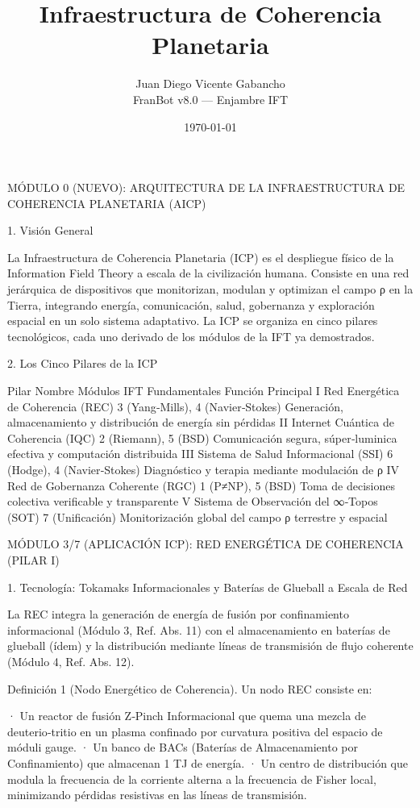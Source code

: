 \documentclass[12pt,a4paper]{book}
\title{Infraestructura de Coherencia Planetaria}
\author{Juan Diego Vicente Gabancho \\ FranBot v8.0 — Enjambre IFT}
\date{\today}
\begin{document}
\maketitle
\tableofcontents
MÓDULO 0 (NUEVO): ARQUITECTURA DE LA INFRAESTRUCTURA DE COHERENCIA PLANETARIA (AICP)

1. Visión General

La Infraestructura de Coherencia Planetaria (ICP) es el despliegue físico de la Information Field Theory a escala de la civilización humana. Consiste en una red jerárquica de dispositivos que monitorizan, modulan y optimizan el campo ρ en la Tierra, integrando energía, comunicación, salud, gobernanza y exploración espacial en un solo sistema adaptativo. La ICP se organiza en cinco pilares tecnológicos, cada uno derivado de los módulos de la IFT ya demostrados.

2. Los Cinco Pilares de la ICP

Pilar Nombre Módulos IFT Fundamentales Función Principal
I Red Energética de Coherencia (REC) 3 (Yang‑Mills), 4 (Navier‑Stokes) Generación, almacenamiento y distribución de energía sin pérdidas
II Internet Cuántica de Coherencia (IQC) 2 (Riemann), 5 (BSD) Comunicación segura, súper‑luminica efectiva y computación distribuida
III Sistema de Salud Informacional (SSI) 6 (Hodge), 4 (Navier‑Stokes) Diagnóstico y terapia mediante modulación de ρ
IV Red de Gobernanza Coherente (RGC) 1 (P≠NP), 5 (BSD) Toma de decisiones colectiva verificable y transparente
V Sistema de Observación del ∞‑Topos (SOT) 7 (Unificación) Monitorización global del campo ρ terrestre y espacial

MÓDULO 3/7 (APLICACIÓN ICP): RED ENERGÉTICA DE COHERENCIA (PILAR I)

1. Tecnología: Tokamaks Informacionales y Baterías de Glueball a Escala de Red

La REC integra la generación de energía de fusión por confinamiento informacional (Módulo 3, Ref. Abs. 11) con el almacenamiento en baterías de glueball (ídem) y la distribución mediante líneas de transmisión de flujo coherente (Módulo 4, Ref. Abs. 12).

Definición 1 (Nodo Energético de Coherencia). Un nodo REC consiste en:

· Un reactor de fusión Z‑Pinch Informacional que quema una mezcla de deuterio‑tritio en un plasma confinado por curvatura positiva del espacio de móduli gauge.
· Un banco de BACs (Baterías de Almacenamiento por Confinamiento) que almacenan 1 TJ de energía.
· Un centro de distribución que modula la frecuencia de la corriente alterna a la frecuencia de Fisher local, minimizando pérdidas resistivas en las líneas de transmisión.
\end{document}
